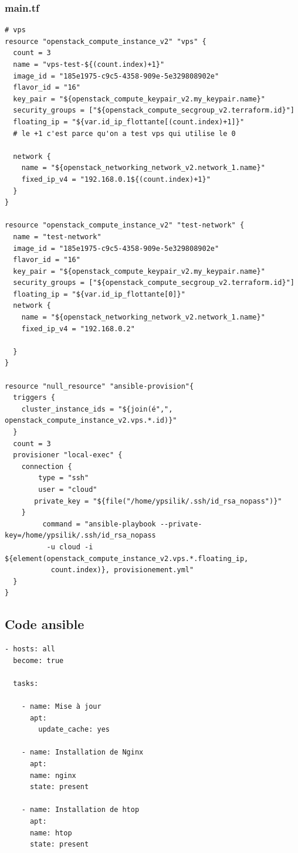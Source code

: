 \documentclass[]{article}
\begin{document}
\subsubsection*{main.tf}
\begin{verbatim}
# vps 
resource "openstack_compute_instance_v2" "vps" {
  count = 3 
  name = "vps-test-${(count.index)+1}"
  image_id = "185e1975-c9c5-4358-909e-5e329808902e"
  flavor_id = "16"
  key_pair = "${openstack_compute_keypair_v2.my_keypair.name}"
  security_groups = ["${openstack_compute_secgroup_v2.terraform.id}"]
  floating_ip = "${var.id_ip_flottante[(count.index)+1]}" 
  # le +1 c'est parce qu'on a test vps qui utilise le 0

  network {
    name = "${openstack_networking_network_v2.network_1.name}"
    fixed_ip_v4 = "192.168.0.1${(count.index)+1}"
  }
}

resource "openstack_compute_instance_v2" "test-network" {
  name = "test-network"
  image_id = "185e1975-c9c5-4358-909e-5e329808902e"
  flavor_id = "16"
  key_pair = "${openstack_compute_keypair_v2.my_keypair.name}"
  security_groups = ["${openstack_compute_secgroup_v2.terraform.id}"]
  floating_ip = "${var.id_ip_flottante[0]}"
  network {
    name = "${openstack_networking_network_v2.network_1.name}"
    fixed_ip_v4 = "192.168.0.2"
    
  }
}

resource "null_resource" "ansible-provision"{
  triggers { 
    cluster_instance_ids = "${join(é",", openstack_compute_instance_v2.vps.*.id)}"
  }
  count = 3 
  provisioner "local-exec" {
    connection {
        type = "ssh"
        user = "cloud"
       private_key = "${file("/home/ypsilik/.ssh/id_rsa_nopass")}"
    }   
         command = "ansible-playbook --private-key=/home/ypsilik/.ssh/id_rsa_nopass
          -u cloud -i ${element(openstack_compute_instance_v2.vps.*.floating_ip,
           count.index)}, provisionement.yml"
  }
}
\end{verbatim}

\subsection*{Code ansible}
\begin{verbatim}
- hosts: all
  become: true

  tasks:  

    - name: Mise à jour 
      apt:
        update_cache: yes

    - name: Installation de Nginx
      apt:
      name: nginx
      state: present

    - name: Installation de htop
      apt:
      name: htop
      state: present
\end{verbatim}
\end{document}
